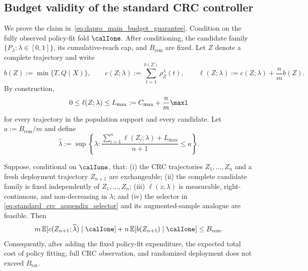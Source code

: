
\subsection{Budget validity of the standard CRC controller}
\label{sec:standard_crc_budget_validity}

We prove the claim in~\eqref{eq:dapro_main_budget_guarantee}.  Condition on
the fully observed policy-fit fold $\calIone$.  After conditioning, the
candidate family $\{P_\lambda:\lambda\in[0,1]\}$, its cumulative-reach cap,
and $B_{\mathrm{rem}}$ are fixed.  Let $Z$ denote a complete trajectory and
write
\[
    b(Z):=\min\{T,Q(X)\},
    \qquad
    c(Z;\lambda):=\sum_{t=1}^{b(Z)}\rho_Z^\lambda(t),
    \qquad
    \ell(Z;\lambda):=c(Z;\lambda)+\frac{n}{m}b(Z).
\]
By construction,
\begin{equation}
    0\leq\ell(Z;\lambda)\leq
    L_{\max}:=C_{\max}+\frac{n}{m}\maxl
    \label{eq:standard_crc_loss_bound}
\end{equation}
for every trajectory in the population support and every candidate.  Let
$a:=B_{\mathrm{rem}}/m$ and define
\begin{equation}
    \widehat\lambda
    :=\sup\left\{\lambda:
       \frac{\sum_{i=1}^{n}\ell(Z_i;\lambda)+L_{\max}}
            {n+1}
       \leq a
    \right\}.
    \label{eq:standard_crc_appendix_selector}
\end{equation}

\begin{proposition}
\label{prop:standard_crc_budget_validity}
Suppose, conditional on $\calIone$, that: (i) the CRC trajectories
$Z_1,\ldots,Z_n$ and a fresh deployment trajectory $Z_{n+1}$ are
exchangeable; (ii) the complete candidate family is fixed independently of
$Z_1,\ldots,Z_n$; (iii) $\ell(z;\lambda)$ is measurable,
right-continuous, and non-decreasing in $\lambda$; and (iv) the selector in
\eqref{eq:standard_crc_appendix_selector} and its augmented-sample analogue
are feasible.  Then
\[
    m\,\mathbb E[c(Z_{n+1};\widehat\lambda)\mid\calIone]
    +n\,\mathbb E[b(Z_{n+1})\mid\calIone]
    \leq B_{\mathrm{rem}}.
\]
Consequently, after adding the fixed policy-fit expenditure, the expected
total cost of policy fitting, full CRC observation, and randomized deployment
does not exceed $B_{\mathrm{tot}}$.
\end{proposition}

